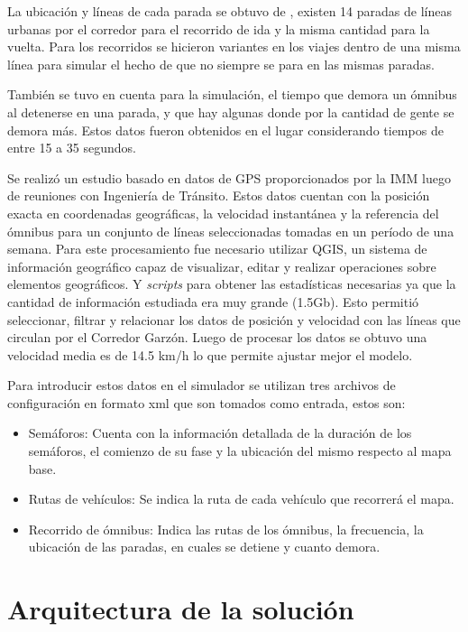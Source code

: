 La ubicación y líneas de cada parada se obtuvo de \citep{sigMontevideo}, existen 14 paradas de líneas urbanas por el corredor para el recorrido de ida y la misma cantidad para la vuelta.
Para los recorridos se hicieron  variantes  en  los  viajes  dentro  de  una  misma línea para simular el hecho de que no siempre se para en las mismas paradas.

También se tuvo en cuenta para la simulación, el tiempo que demora un ómnibus al detenerse en una parada, y que hay algunas donde por la cantidad de gente se demora más. Estos datos fueron obtenidos en el lugar considerando tiempos de entre 15 a 35 segundos.

Se realizó un estudio basado en datos de GPS proporcionados por la IMM luego de reuniones con Ingeniería de Tránsito. Estos datos cuentan con la posición exacta en coordenadas geográficas, la velocidad instantánea y la referencia del ómnibus para un conjunto de líneas seleccionadas tomadas en un período de una semana. 
Para este procesamiento fue necesario utilizar QGIS, un sistema de información geográfico capaz de visualizar, editar y realizar operaciones sobre elementos geográficos. Y \emph{scripts} para obtener las estadísticas necesarias ya que la cantidad de información estudiada era muy grande (1.5Gb). Esto permitió seleccionar, filtrar y relacionar los datos de posición y velocidad con las líneas que circulan por el Corredor Garzón. Luego de procesar los datos se obtuvo una velocidad media es de 14.5 km/h lo que permite ajustar mejor el modelo. 

Para introducir estos datos en el simulador se utilizan tres archivos de configuración en formato xml que son tomados como entrada, estos son:

\begin{itemize}
	\item Semáforos: Cuenta con la información detallada de la duración de los semáforos, el comienzo de su fase y la ubicación del mismo respecto al mapa base.
	\item Rutas de vehículos: Se indica la ruta de cada vehículo que recorrerá el mapa.
	\item Recorrido de ómnibus: Indica las rutas de los ómnibus, la frecuencia, la ubicación de las paradas, en cuales se detiene y cuanto demora.
\end{itemize}




\section{Arquitectura de la solución}

